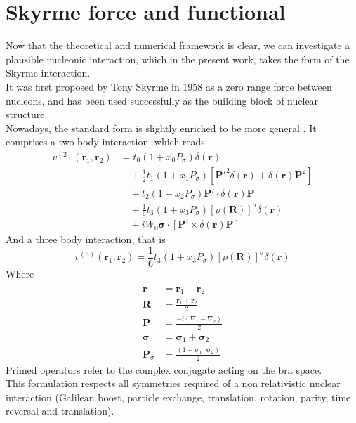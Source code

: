 \section{Skyrme force and functional}
Now that the theoretical and numerical framework is clear, we can investigate a plausible nucleonic interaction, which in the present work, takes the form of the Skyrme interaction.
\\It was first proposed by Tony Skyrme in 1958 \cite{SKYRME1958615} as a zero range force between nucleons, and has been used successfully as the building block of nuclear structure.
\\Nowadays, the standard form is slightly enriched to be more general \cite{CHABANAT1997710}. It comprises a two-body interaction, which reads
\begin{align}
v^{(2)}(\mathbf{r}_1, \mathbf{r}_2) &= t_0 \left(1 + x_0 P_\sigma \right) \delta(\mathbf{r}) \\
&\quad + \frac{1}{2} t_1 \left(1 + x_1 P_\sigma \right) \left[ \mathbf{P}'^2 \delta(\mathbf{r}) + \delta(\mathbf{r}) \mathbf{P}^2 \right] \\
&\quad + t_2 \left(1 + x_2 P_\sigma \right) \mathbf{P}' \cdot \delta(\mathbf{r}) \mathbf{P} \\
&\quad + \frac{1}{6} t_3 \left(1 + x_3 P_\sigma \right) \left[ \rho(\mathbf{R}) \right]^\sigma \delta(\mathbf{r}) \\
&\quad + i W_0 \boldsymbol{\sigma}\cdot \left[ \mathbf{P}' \times \delta(\mathbf{r}) \mathbf{P} \right]
\end{align}
And a three body interaction, that is
\begin{equation}
v^{(3)}(\mathbf r_1, \mathbf r_2)=\frac 1 6 t_3 \left(1 + x_3 P_\sigma \right) \left[ \rho(\mathbf{R}) \right]^\sigma \delta(\mathbf{r}) 
\end{equation}
Where 
\begin{align*}
\\\mathbf{r} &= \mathbf{r}_1 - \mathbf{r}_2
\\\mathbf{R} &= \frac{\mathbf{r}_1+\mathbf{r}_2}{2}
\\\mathbf{P} &= \frac{-i(\nabla_1 - \nabla_2)}{2}
\\\boldsymbol{\sigma} &= \boldsymbol{\sigma}_1 + \boldsymbol{\sigma}_2
\\\mathbf{P}_\sigma &= \frac{(1+\boldsymbol{\sigma}_1\cdot\boldsymbol{\sigma}_2)}{2}
\end{align*}
Primed operators refer to the complex conjugate acting on the bra space.
\\This formulation respects all symmetries required of a non relativistic nuclear interaction (Galilean boost, particle exchange, translation, rotation, parity, time reversal and translation).
